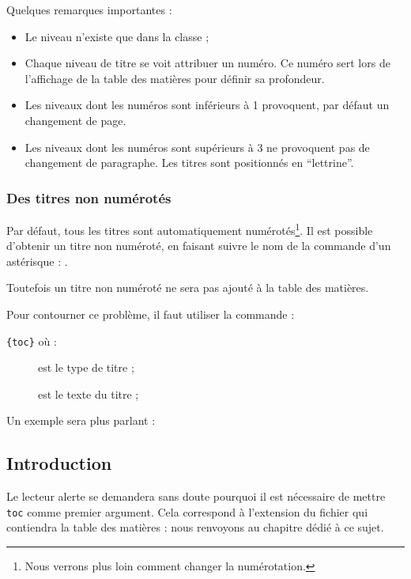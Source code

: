 Quelques remarques importantes :
\begin{itemize}
\item Le niveau  n'existe que dans la classe  ;
\item Chaque niveau de titre se voit attribuer un numéro. Ce numéro sert lors de l'affichage de la table des matières pour définir sa profondeur.\label{numeroniveau}
\item Les niveaux dont les numéros sont inférieurs à 1 provoquent, par défaut un changement de page.
\item Les niveaux dont les numéros sont supérieurs à 3 ne provoquent pas de changement de paragraphe. Les titres sont positionnés en \enquote{lettrine}.
\end{itemize}

\subsection{Des titres non numérotés}\label{titresansnumero}
Par défaut, tous les titres sont automatiquement numérotés\footnote{Nous verrons plus loin comment changer la numérotation.}. Il est possible d'obtenir un titre non numéroté, en faisant suivre le nom de la commande d'un astérisque : .


Toutefois un titre non numéroté ne sera pas ajouté à la table des matières. 

Pour contourner ce problème, il faut utiliser la commande :

\verb|{toc}| où : \label{addcontentsline}

\begin{description}
    \item[] est le type de titre ;
    \item[] est le texte du titre ;
\end{description}

Un exemple sera plus parlant :


\begin{latexcode}
\chapter*{Introduction}
\end{latexcode}


\begin{plusloins}
Le lecteur alerte se demandera sans doute pourquoi il est nécessaire de mettre \verb|toc| comme premier argument. Cela correspond à l'extension du fichier qui contiendra la table des matières : nous renvoyons au chapitre dédié à ce sujet.
\end{plusloins}

